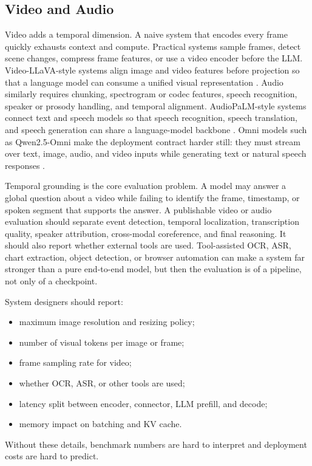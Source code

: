 \subsection{Video and Audio}
Video adds a temporal dimension. A naive system that encodes every frame quickly exhausts context and compute. Practical systems sample frames, detect scene changes, compress frame features, or use a video encoder before the LLM. Video-LLaVA-style systems align image and video features before projection so that a language model can consume a unified visual representation \cite{lin2023videollava}. Audio similarly requires chunking, spectrogram or codec features, speech recognition, speaker or prosody handling, and temporal alignment. AudioPaLM-style systems connect text and speech models so that speech recognition, speech translation, and speech generation can share a language-model backbone \cite{rubenstein2023audiopalm}. Omni models such as Qwen2.5-Omni make the deployment contract harder still: they must stream over text, image, audio, and video inputs while generating text or natural speech responses \cite{qwen2025omni}.

Temporal grounding is the core evaluation problem. A model may answer a global question about a video while failing to identify the frame, timestamp, or spoken segment that supports the answer. A publishable video or audio evaluation should separate event detection, temporal localization, transcription quality, speaker attribution, cross-modal coreference, and final reasoning. It should also report whether external tools are used. Tool-assisted OCR, ASR, chart extraction, object detection, or browser automation can make a system far stronger than a pure end-to-end model, but then the evaluation is of a pipeline, not only of a checkpoint.

System designers should report:
\begin{itemize}
    \item maximum image resolution and resizing policy;
    \item number of visual tokens per image or frame;
    \item frame sampling rate for video;
    \item whether OCR, ASR, or other tools are used;
    \item latency split between encoder, connector, LLM prefill, and decode;
    \item memory impact on batching and KV cache.
\end{itemize}
Without these details, benchmark numbers are hard to interpret and deployment costs are hard to predict.

